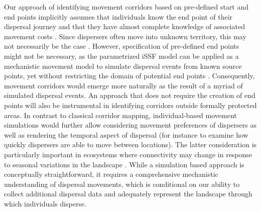 \documentclass[abstract=on,10pt,a4paper,bibliography=totocnumbered]{article}
\begin{document}
Our approach of identifying movement corridors based on pre-defined start and
end points implicitly assumes that individuals know the end point of their
dispersal journey and that they have almost complete knowledge of associated
movement costs \citep{Panzacchi.2016}. Since dispersers often move into unknown
territory, this may not necessarily be the case \citep{Abrahms.2017,
Woodroffe.2019, Cozzi.2020}. However, specification of pre-defined end points
might not be necessary, as the parametrized iSSF model can be applied as a
mechanistic movement model to simulate dispersal events from known source
points, yet without restricting the domain of potential end points
\citep{Signer.2017}. Consequently, movement corridors would emerge more
naturally as the result of a myriad of simulated dispersal events. An approach
that does not require the creation of end points will also be instrumental in
identifying corridors outside formally protected areas. In contrast to classical
corridor mapping, individual-based movement simulations would further allow
considering movement preferences of dispersers as well as rendering the temporal
aspect of dispersal (for instance to examine how quickly dispersers are able to
move between locations). The latter consideration is particularly important in
ecosystems where connectivity may change in response to seasonal variations in
the landscape \citep{Osipova.2019}. While a simulation based approach is
conceptually straightforward, it requires a comprehensive mechanistic
understanding of dispersal movements, which is conditional on our ability to
collect additional dispersal data and adequately represent the landscape through
which individuals disperse.
\end{document}
